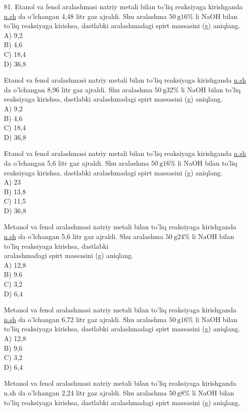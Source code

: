 81. Etanol va fenol aralashmasi natriy metali bilan to'liq reaksiyaga kirishganda \href{http://n.sh}{n.sh} da o'lchangan 4,48 litr gaz ajraldi. Shu aralashma $50 \mathrm{~g} 16 \%$ li NaOH bilan to'liq reaksiyaga kirishsa, dastlabki aralashmadagi spirt massasini (g) aniqlang.\\
A) 9,2\\
B) 4,6\\
C) 18,4\\
D) 36,8
  \item Etanol va fenol aralashmasi natriy metali bilan to'liq reaksiyaga kirishganda \href{http://n.sh}{n.sh} da o'lchangan 8,96 litr gaz ajraldi. Shu aralashma $50 \mathrm{~g} 32 \%$ li NaOH bilan to'liq reaksiyaga kirishsa, dastlabki aralashmadagi spirt massasini (g) aniqlang.\\
A) 9,2\\
B) 4,6\\
C) 18,4\\
D) 36,8
  \item Etanol va fenol aralashmasi natriy metali bilan to'liq reaksiyaga kirishganda \href{http://n.sh}{n.sh} da o'lchangan 5,6 litr gaz ajraldi. Shu aralashma $50 \mathrm{~g} 16 \%$ li NaOH bilan to'liq reaksiyaga kirishsa, dastlabki aralashmadagi spirt massasini (g) aniqlang.\\
A) 23\\
B) 13,8\\
C) 11,5\\
D) 36,8
  \item Metanol va fenol aralashmasi natriy metali bilan to'liq reaksiyaga kirishganda \href{http://n.sh}{n.sh} da o'lchangan 5,6 litr gaz ajraldi. Shu aralashma $50 \mathrm{~g} 24 \%$ li NaOH bilan to'liq reaksiyaga kirishsa, dastlabki\\
aralashmadagi spirt massasini (g) aniqlang.\\
A) 12,8\\
B) 9.6\\
C) 3,2\\
D) 6,4
  \item Metanol va fenol aralashmasi natriy metali bilan to'liq reaksiyaga kirishganda \href{http://n.sh}{n.sh} da o'lchangan 6,72 litr gaz ajraldi. Shu aralashma $50 \mathrm{~g} 16 \%$ li NaOH bilan to'liq reaksiyaga kirishsa, dastlabki aralashmadagi spirt massasini (g) aniqlang.\\
A) 12,8\\
B) 9,6\\
C) 3,2\\
D) 6,4
  \item Metanol va fenol aralashmasi natriy metali bilan to'liq reaksiyaga kirishganda $\mathrm{n} . \mathrm{sh}$ da o'lchangan 2,24 litr gaz ajraldi. Shu aralashma $50 \mathrm{~g} 8 \%$ li NaOH bilan to'liq reaksiyaga kirishsa, dastlabki aralashmadagi spirt massasini (g) aniqlang.\\

